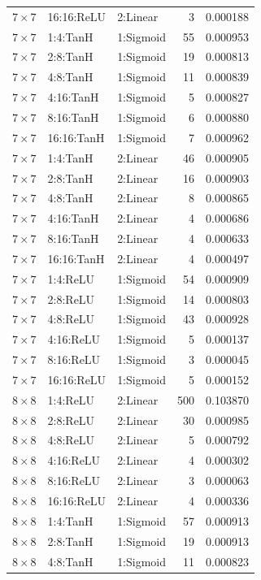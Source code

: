 \begin{table}[h]
\begin{tabular}{lllrr}
		$7\times7$ & 16:16:ReLU & 2:Linear & 3 & 0.000188 \\
		$7\times7$ & 1:4:TanH & 1:Sigmoid & 55 & 0.000953 \\
		$7\times7$ & 2:8:TanH & 1:Sigmoid & 19 & 0.000813 \\
		$7\times7$ & 4:8:TanH & 1:Sigmoid & 11 & 0.000839 \\
		$7\times7$ & 4:16:TanH & 1:Sigmoid & 5 & 0.000827 \\
		$7\times7$ & 8:16:TanH & 1:Sigmoid & 6 & 0.000880 \\
		$7\times7$ & 16:16:TanH & 1:Sigmoid & 7 & 0.000962 \\
		$7\times7$ & 1:4:TanH & 2:Linear & 46 & 0.000905 \\
		$7\times7$ & 2:8:TanH & 2:Linear & 16 & 0.000903 \\
		$7\times7$ & 4:8:TanH & 2:Linear & 8 & 0.000865 \\
		$7\times7$ & 4:16:TanH & 2:Linear & 4 & 0.000686 \\
		$7\times7$ & 8:16:TanH & 2:Linear & 4 & 0.000633 \\
		$7\times7$ & 16:16:TanH & 2:Linear & 4 & 0.000497 \\
		$7\times7$ & 1:4:ReLU & 1:Sigmoid & 54 & 0.000909 \\
		$7\times7$ & 2:8:ReLU & 1:Sigmoid & 14 & 0.000803 \\
		$7\times7$ & 4:8:ReLU & 1:Sigmoid & 43 & 0.000928 \\
		$7\times7$ & 4:16:ReLU & 1:Sigmoid & 5 & 0.000137 \\
		$7\times7$ & 8:16:ReLU & 1:Sigmoid & 3 & 0.000045 \\
		$7\times7$ & 16:16:ReLU & 1:Sigmoid & 5 & 0.000152 \\
		\midrule
		$8\times8$ & 1:4:ReLU & 2:Linear & 500 & 0.103870 \\
		$8\times8$ & 2:8:ReLU & 2:Linear & 30 & 0.000985 \\
		$8\times8$ & 4:8:ReLU & 2:Linear & 5 & 0.000792 \\
		$8\times8$ & 4:16:ReLU & 2:Linear & 4 & 0.000302 \\
		$8\times8$ & 8:16:ReLU & 2:Linear & 3 & 0.000063 \\
		$8\times8$ & 16:16:ReLU & 2:Linear & 4 & 0.000336 \\
		$8\times8$ & 1:4:TanH & 1:Sigmoid & 57 & 0.000913 \\
		$8\times8$ & 2:8:TanH & 1:Sigmoid & 19 & 0.000913 \\
		$8\times8$ & 4:8:TanH & 1:Sigmoid & 11 & 0.000823 \\

\end{tabular}
\end{table}
